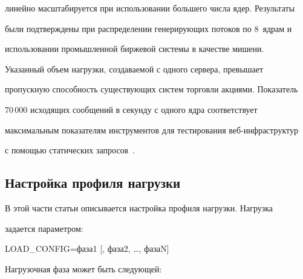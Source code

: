 линейно масштабируется при использовании большего числа ядер. Результаты


были подтверждены при распределении генерирующих потоков по 8~ядрам и


использовании промышленной биржевой системы в качестве мишени.


Указанный объем нагрузки, создаваемой с одного сервера, превышает


пропускную способность существующих систем торговли акциями. Показатель


70\,000 исходящих сообщений в секунду с одного ядра соответствует


максимальным показателям инструментов для тестирования веб-инфраструктур


с помощью статических запросов~\cite{17-g}.








\vspace*{-6pt}





  \subsection{Настройка профиля нагрузки}





  В этой части статьи описывается настройка профиля нагрузки. Нагрузка


задается параметром:





{\sf    LOAD\_CONFIG\;=\;фаза1 [, фаза2, \ldots , фазаN]}





  Нагрузочная фаза может быть следующей:


